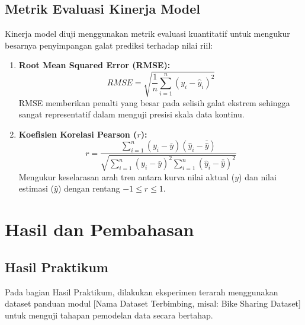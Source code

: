 \documentclass[a4paper,oneside,11pt]{book}
\begin{document}
\section{Metrik Evaluasi Kinerja Model}
Kinerja model diuji menggunakan metrik evaluasi kuantitatif untuk mengukur besarnya penyimpangan galat prediksi terhadap nilai riil:
\begin{enumerate}
    \item \textbf{Root Mean Squared Error (RMSE):}
    \begin{equation}
        RMSE = \sqrt{\frac{1}{n}\sum_{i=1}^{n}\left(y_{i} - \hat{y}_{i}\right)^2}
        \label{eq:rmse}
    \end{equation}
    RMSE memberikan penalti yang besar pada selisih galat ekstrem sehingga sangat representatif dalam menguji presisi skala data kontinu.
    
    \item \textbf{Koefisien Korelasi Pearson ($r$):}
    \begin{equation}
        r = \frac{\sum_{i=1}^{n}(y_{i} - \bar{y})(\hat{y}_{i} - \bar{\hat{y}})}{\sqrt{\sum_{i=1}^{n}(y_{i} - \bar{y})^2 \sum_{i=1}^{n}(\hat{y}_{i} - \bar{\hat{y}})^2}}
        \label{eq:pearson}
    \end{equation}
    Mengukur keselarasan arah tren antara kurva nilai aktual ($y$) dan nilai estimasi ($\hat{y}$) dengan rentang $-1 \le r \le 1$.
\end{enumerate}

\chapter{Hasil dan Pembahasan}
\label{chap:hasilpembahasan}

\section{Hasil Praktikum}
\label{sec:hasilpraktikum}

Pada bagian Hasil Praktikum, dilakukan eksperimen terarah menggunakan dataset panduan modul [Nama Dataset Terbimbing, misal: Bike Sharing Dataset] untuk menguji tahapan pemodelan data secara bertahap.
\end{document}
